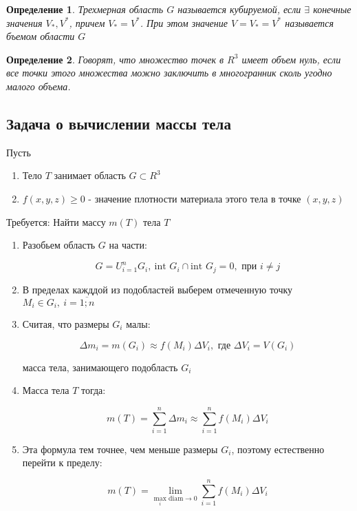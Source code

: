 \documentclass[a4paper, 14pt]{report}
\newtheorem{defenition}{Определение}[section]
\begin{document}
\begin{defenition}
    Трехмерная область $G$ называется кубируемой, если $\exists$ конечные значения $V_*, V^*$, причем $V_* = V^*$. При этом значение $V = V_* = V^*$ называется бъемом области $G$
\end{defenition}

\begin{defenition}
    Говорят, что множество точек в $R^3$ имеет объем нуль, если все точки этого множества можно заключить в многогранник сколь угодно малого объема.
\end{defenition}

\subsection{Задача о вычислении массы тела}

Пусть 

\begin{enumerate}
    \item Тело $T$ занимает область $G \subset R^3$
    \item $f(x,y,z) \geq 0$ - значение плотности материала этого тела в точке $(x,y,z)$
\end{enumerate}

Требуется: Найти массу $m(T)$ тела $T$

\begin{enumerate}
    \item Разобьем область $G$ на части:

        $$
        G = U_{i=1}^{n} G_i,\ \text{int }G_i \cap \text{int } G_j = 0, \text{ при } i \ne j
        $$

    \item В пределах кажддой из подобластей выберем отмеченную точку $M_i \in G_i,\ i = \overline{1;n}$

    \item Считая, что размеры $G_i$ малы:

        $$
        \Delta m_i = m(G_i) \approx f(M_i) \Delta V_i, \text{ где } \Delta V_i = V(G_i)
        $$

        масса тела, занимающего подобласть $G_i$

    \item Масса тела $T$ тогда:

        $$
        m(T) = \sum_{i=1}^n \Delta m_i \approx \sum_{i=1}^n f(M_i) \Delta V_i
        $$

    \item Эта формула тем точнее, чем меньше размеры $G_i$, поэтому естественно перейти к пределу:

        $$
        m(T) = \underset{ \underset{i}{\text{max}}\text{ diam} \to 0 }{\lim} \sum_{i=1}^n f(M_i) \Delta V_i
        $$
\end{enumerate}
\end{document}
